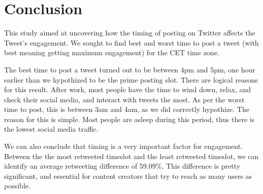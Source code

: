 \documentclass[11pt]{article}
\begin{document}
\section{Conclusion}
This study aimed at uncovering how the timing of posting on Twitter affects the Tweet's engagement. We sought to find best and worst time to post a tweet (with best meaning getting maximum engagement) for the CET time zone.

The best time to post a tweet turned out to be between 4pm and 5pm, one hour earlier than we hypothized to be the prime posting slot. There are logical reasons for this result. After work, most people have the time to wind down, relax, and check their social media, and interact with tweets the most. As per the worst time to post, this is between 3am and 4am, as we did correctly hypothize. The reason for this is simple. Most people are asleep during this period, thus there is the lowest social media traffic.

We can also conclude that timing is a very important factor for engagement. Between the the most retweeted timeslot and the least retweeted timeslot, we can identify an average retweeting difference of 59.09\%. This difference is pretty significant, and essential for content creators that try to reach as many users as possible.







\end{document}
